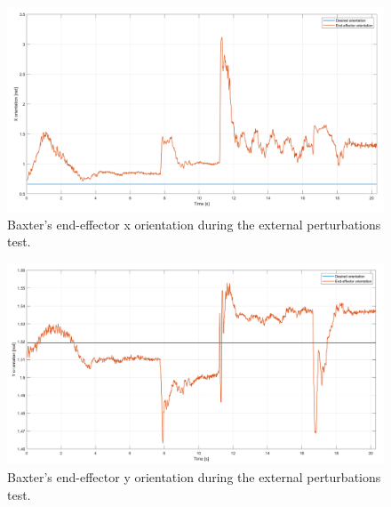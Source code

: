 \documentclass[11pt]{report} %
\begin{document}
\begin{figure}[H]
    \centering
    \includegraphics[width=1.0\linewidth]{assets/imgs/control_theory/mpc_regulation_external_perturbations/x_orientation.png}
    \caption{Baxter's end-effector x orientation during the external perturbations test.} 
    \label{fig_baxter_x_orientation_mpc_external_perturbations_experiments}
\end{figure}

\begin{figure}[H]
    \centering
    \includegraphics[width=1.0\linewidth]{assets/imgs/control_theory/mpc_regulation_external_perturbations/y_orientation.png}
    \caption{Baxter's end-effector y orientation during the external perturbations test.} 
    \label{fig_baxter_y_orientation_mpc_external_perturbations_experiments}
\end{figure}
\end{document}
